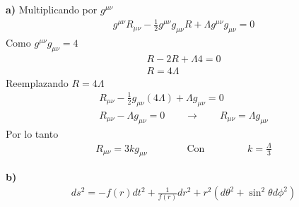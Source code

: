 \documentclass{article}
\begin{document}
\textbf{a) } Multiplicando por $ g ^ {\mu\nu} $
\begin{gather*}
  g ^ {\mu\nu}R _{\mu\nu} - \frac{1}{2} g ^ {\mu\nu}g _{\mu\nu} R + \Lambda g ^ {\mu\nu}g_{\mu\nu} =0 
\end{gather*}
Como $ g ^ {\mu\nu}g _ {\mu\nu} = 4 $
\begin{gather*}
  R - 2R + \Lambda 4 = 0 \\
  R = 4\Lambda 
\end{gather*}
Reemplazando $ R= 4\Lambda  $
\begin{gather*}
  R _{\mu\nu} - \frac{1}{2} g _{\mu\nu} (4\Lambda) + \Lambda g_{\mu\nu} =0 \\
  R _{\mu\nu} - \Lambda g _{\mu\nu} = 0 \qquad \rightarrow \qquad R _{\mu\nu} = \Lambda g _{\mu\nu} 
\end{gather*}
Por lo tanto 
\begin{gather*}
  R _{\mu\nu} = 3k g _{\mu\nu} \qquad \qquad \text{Con }\qquad \qquad k = \frac{\Lambda }{3 } 
\end{gather*}

\hfill 

\hfill 

\textbf{b) } 
\begin{gather*}
  ds^2 = - f(r) dt^2 + \frac{1}{f(r) }dr^2 + r^2 (d\theta^2 + \sin^2{\theta}d\phi^2) 
\end{gather*}

\hfill 
\end{document}

